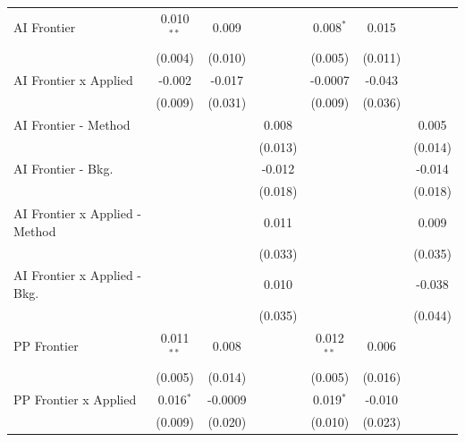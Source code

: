\begin{tabular}{lcccccc}
   AI Frontier                    & 0.010$^{**}$   & 0.009          &         & 0.008$^{*}$    & 0.015         &   \\   
                                  & (0.004)        & (0.010)        &         & (0.005)        & (0.011)       &   \\   
   AI Frontier x Applied          & -0.002         & -0.017         &         & -0.0007        & -0.043        &   \\   
                                  & (0.009)        & (0.031)        &         & (0.009)        & (0.036)       &   \\   
   AI Frontier - Method           &                &                & 0.008   &                &               & 0.005\\   
                                  &                &                & (0.013) &                &               & (0.014)\\   
   AI Frontier - Bkg.             &                &                & -0.012  &                &               & -0.014\\   
                                  &                &                & (0.018) &                &               & (0.018)\\   
   AI Frontier x Applied - Method &                &                & 0.011   &                &               & 0.009\\   
                                  &                &                & (0.033) &                &               & (0.035)\\   
   AI Frontier x Applied - Bkg.   &                &                & 0.010   &                &               & -0.038\\   
                                  &                &                & (0.035) &                &               & (0.044)\\   
   PP Frontier                    & 0.011$^{**}$   & 0.008          &         & 0.012$^{**}$   & 0.006         &   \\   
                                  & (0.005)        & (0.014)        &         & (0.005)        & (0.016)       &   \\   
   PP Frontier x Applied          & 0.016$^{*}$    & -0.0009        &         & 0.019$^{*}$    & -0.010        &   \\   
                                  & (0.009)        & (0.020)        &         & (0.010)        & (0.023)       &   \\   

\end{tabular}
